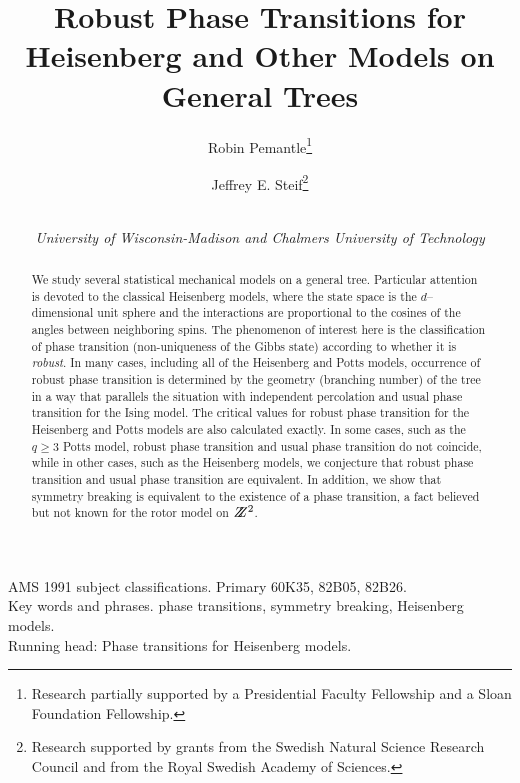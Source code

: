 \begin{titlepage}

\title{Robust Phase Transitions for Heisenberg and Other Models 
on General Trees}
\author{Robin Pemantle\thanks{Research partially
supported by a Presidential Faculty Fellowship and a Sloan Foundation
Fellowship.}
\and Jeffrey E. Steif\thanks{Research supported by
grants from the Swedish Natural Science Research Council and from
the Royal Swedish Academy of Sciences.}
 \and \\
\it  University of Wisconsin-Madison
   and Chalmers University of Technology } 
\date{}
\maketitle


\begin{abstract}
We study several statistical mechanical models on a general tree.
Particular attention is devoted to the classical
Heisenberg models, where the state
space is the $d$--dimensional unit sphere  
and the interactions are proportional to
the cosines of the angles between neighboring spins.  The phenomenon of
interest here is the classification of phase transition
(non-uniqueness of the Gibbs state) according to whether it is {\it robust}.
In many cases, including all of the Heisenberg and Potts models,
occurrence of robust phase transition is determined by the geometry 
(branching number) of
the tree in a way that parallels the situation with independent 
percolation and usual phase transition for the Ising model. The critical
values for robust phase transition for the Heisenberg and Potts
models are also calculated exactly. In some cases, such as the $q\ge 3$ Potts 
model, robust phase transition and usual phase transition do not coincide, 
while in other cases, such as the Heisenberg models, we conjecture that robust
phase transition and usual phase transition are equivalent. In addition,
we show that symmetry breaking is equivalent to the existence of a phase
transition, a fact believed but not known for the rotor model on $Z\!\!\!Z^2$.
\end{abstract}

\noindent
AMS 1991 subject classifications. Primary 60K35, 82B05, 82B26. \\
Key words and phrases. phase transitions, symmetry breaking, Heisenberg
models.\\
Running head: Phase transitions for Heisenberg models.
\end{titlepage}




